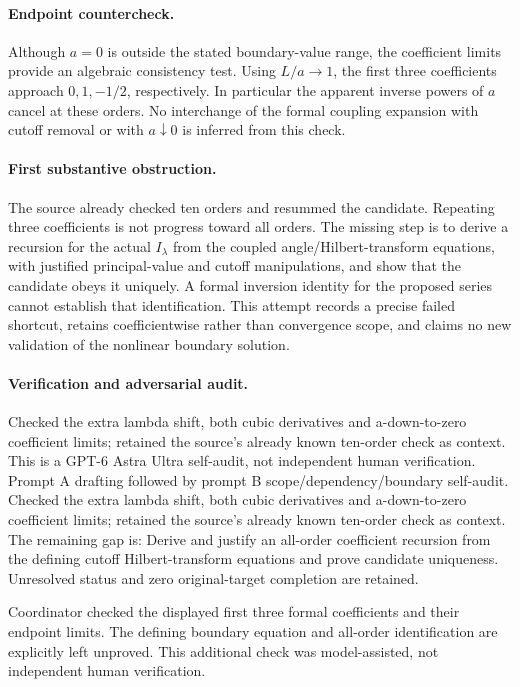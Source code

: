 \documentclass[11pt]{article}
\begin{document}
\paragraph{Endpoint countercheck.} Although \(a=0\) is outside the stated boundary-value range, the coefficient limits provide an algebraic consistency test. Using \(L/a\to1\), the first three coefficients approach \(0,1,-1/2\), respectively. In particular the apparent inverse powers of \(a\) cancel at these orders. No interchange of the formal coupling expansion with cutoff removal or with \(a\downarrow0\) is inferred from this check.
\paragraph{First substantive obstruction.} The source already checked ten orders and resummed the candidate. Repeating three coefficients is not progress toward all orders. The missing step is to derive a recursion for the actual \(I_\lambda\) from the coupled angle/Hilbert-transform equations, with justified principal-value and cutoff manipulations, and show that the candidate obeys it uniquely. A formal inversion identity for the proposed series cannot establish that identification. This attempt records a precise failed shortcut, retains coefficientwise rather than convergence scope, and claims no new validation of the nonlinear boundary solution.

\paragraph{Verification and adversarial audit.}
Checked the extra lambda shift, both cubic derivatives and a-down-to-zero coefficient limits; retained the source’s already known ten-order check as context. This is a GPT-6 Astra Ultra self-audit, not independent human verification. Prompt A drafting followed by prompt B scope/dependency/boundary self-audit. Checked the extra lambda shift, both cubic derivatives and a-down-to-zero coefficient limits; retained the source’s already known ten-order check as context. The remaining gap is: Derive and justify an all-order coefficient recursion from the defining cutoff Hilbert-transform equations and prove candidate uniqueness. Unresolved status and zero original-target completion are retained.

Coordinator checked the displayed first three formal coefficients and their endpoint limits. The defining boundary equation and all-order identification are explicitly left unproved. This additional check was model-assisted, not independent human verification.
\end{document}
